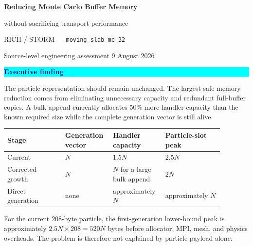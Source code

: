 \documentclass[11pt]{article}
\newcommand{\callout}[3]{%
  \noindent\colorbox{#1}{%
    \parbox{\dimexpr\linewidth-2\fboxsep}{%
      \textcolor{#2}{\bfseries #3}%
    }%
  }%
}
\begin{document}
\begin{center}
  \vspace*{8mm}
  {\fontsize{25}{29}\selectfont\bfseries\color{navy}
    Reducing Monte Carlo Buffer Memory\par}
  \vspace{2mm}
  {\fontsize{18}{22}\selectfont\color{blue}
    without sacrificing transport performance\par}
  \vspace{7mm}
  {\large RICH / STORM --- \texttt{moving\_slab\_mc\_32}}\par
  \vspace{2mm}
  {\color{muted}Source-level engineering assessment \textbullet{} 9 August 2026}
\end{center}

\vspace{8mm}
\callout{cyan}{navy}{Executive finding}

The particle representation should remain unchanged. The largest safe memory
reduction comes from eliminating unnecessary capacity and redundant full-buffer
copies. A bulk append currently allocates 50\% more handler capacity than the
known required size while the complete generation vector is still alive.

\vspace{2mm}
\begin{center}
\renewcommand{\arraystretch}{1.45}
\begin{tabular}{>{\raggedright\arraybackslash}p{0.25\linewidth}
                >{\centering\arraybackslash}p{0.18\linewidth}
                >{\centering\arraybackslash}p{0.20\linewidth}
                >{\raggedright\arraybackslash}p{0.25\linewidth}}
\toprule
\textbf{Stage} & \textbf{Generation vector} & \textbf{Handler capacity} & \textbf{Particle-slot peak} \\
\midrule
Current & $N$ & $1.5N$ & $2.5N$ \\
Corrected growth & $N$ & $N$ for a large bulk append & $2N$ \\
Direct generation & none & approximately $N$ & approximately $N$ \\
\bottomrule
\end{tabular}
\end{center}

For the current 208-byte particle, the first-generation lower-bound peak is
approximately $2.5N\times208=520N$ bytes before allocator, MPI, mesh, and physics
overheads. The problem is therefore not explained by particle payload alone.
\end{document}
